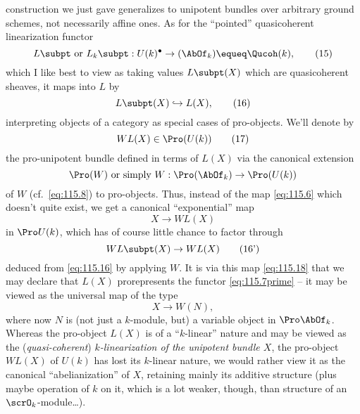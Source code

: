 construction we just gave generalizes to unipotent bundles over
arbitrary ground schemes, not necessarily affine ones. As for the
``pointed'' quasicoherent linearization functor
\begin{equation}
  \label{eq:115.15}
  L\subpt \text{ or } {L_k}\subpt: U(k)^\bullet \to (\AbOf_k) \equeq \Qucoh(k),\tag{15}
\end{equation}
which I like best to view as taking values $L\subpt(X)$ which are
quasicoherent sheaves, it maps into $L$ by
\begin{equation}
  \label{eq:115.16}
  L\subpt(X)\hookrightarrow L(X),\tag{16}
\end{equation}
interpreting objects of a category as special cases of
pro-objects. We'll denote by
\begin{equation}
  \label{eq:115.17}
  WL(X) \in \Pro(U(k))\tag{17}
\end{equation}
the pro-unipotent bundle defined in terms of $L(X)$ via
the canonical extension
\[\Pro(W)\text{ or simply } W:\Pro(\AbOf_k)\to\Pro(U(k))\]
of $W$ (cf.~\eqref{eq:115.8}) to pro-objects. Thus, instead of the map
\eqref{eq:115.6} which doesn't quite exist, we get a canonical
``exponential'' map
\begin{equation}
  \label{eq:115.18}
  X\to WL(X)\tag{18}
\end{equation}
in $\Pro U(k)$, which has of course little chance to factor through
\begin{equation}
  \label{eq:115.16prime}
  WL\subpt(X)\to WL(X)\tag{16'}
\end{equation}
deduced from \eqref{eq:115.16} by applying $W$. It is via this map
\eqref{eq:115.18} that we may declare that $L(X)$ prorepresents the
functor \eqref{eq:115.7prime} -- it may be viewed as the universal map
of the type
\[X\to W(N),\]
where now $N$ is (not just a $k$-module, but) a variable object in
$\Pro \AbOf_k$. Whereas the pro-object $L(X)$ is of a ``$k$-linear''
nature and may be viewed as the (\emph{quasi-coherent})
\emph{$k$-linearization of the unipotent bundle $X$}, the pro-object
$WL(X)$ of $U(k)$ has lost its $k$-linear nature, we would rather view
it as the canonical ``abelianization'' of $X$, retaining mainly its
additive structure (plus maybe operation of $k$ on it, which is a lot
weaker, though, than structure of an $\scrO_k$-module\dots).

